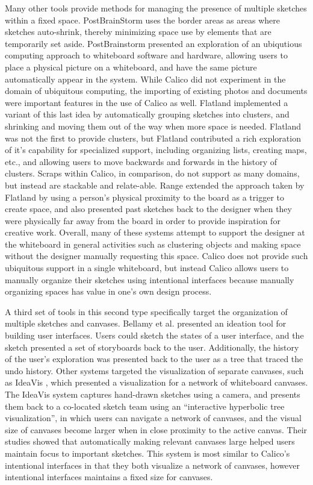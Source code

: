 \documentclass[12pt,fleqn]{ucithesis}
\begin{document}
Many other tools provide methods for managing the presence of multiple sketches within a fixed space. PostBrainStorm \citep{guimbretiere2001fluid} uses the border areas as areas where sketches auto-shrink, thereby minimizing space use by elements that are temporarily set aside. PostBrainstorm presented an exploration of an ubiqutious computing approach to whiteboard software and hardware, allowing users to place a physical picture on a whiteboard, and have the same picture automatically appear in the system. While Calico did not experiment in the domain of ubiquitous computing, the importing of existing photos and documents were important features in the use of Calico as well. Flatland \citep{mynatt1999flatland} implemented a variant of this last idea by automatically grouping sketches into clusters, and shrinking and moving them out of the way when more space is needed. Flatland was not the first to provide clusters, but Flatland contributed a rich exploration of it's capability for specialized support, including organizing lists, creating maps, etc., and allowing users to move backwards and forwards in the history of clusters. Scraps within Calico, in comparison, do not support as many domains, but instead are stackable and relate-able. Range \citep{Ju} extended the approach taken by Flatland by using a person's physical proximity to the board as a trigger to create space, and also presented past sketches back to the designer when they were physically far away from the board in order to provide inspiration for creative work. Overall, many of these systems attempt to support the designer at the whiteboard in general activities such as clustering objects and making space without the designer manually requesting this space. Calico does not provide such ubiquitous support in a single whiteboard, but instead Calico allows users to manually organize their sketches using intentional interfaces because manually organizing spaces has value in one's own design process.

A third set of tools in this second type specifically target the organization of multiple sketches and canvases. Bellamy et al. \cite{Bellamy:2011:STI:1985793.1985909} presented an ideation tool for building user interfaces. Users could sketch the states of a user interface, and the sketch presented a set of storyboards back to the user. Additionally, the history of the user's exploration was presented back to the user as a tree that traced the undo history. Other systems targeted the visualization of separate canvases, such as IdeaVis \cite{geyer2012ideavis}, which presented a visualization for a network of whiteboard canvases. The IdeaVis system captures hand-drawn sketches using a camera, and presents them back to a co-located sketch team using an ``interactive hyperbolic tree visualization'', in which users can navigate a network of canvases, and the visual size of canvases become larger when in close proximity to the active canvas. Their studies showed that automatically making relevant canvases large helped users maintain focus to important sketches. This system is most similar to Calico's intentional interfaces in that they both visualize a network of canvases, however intentional interfaces maintains a fixed size for canvases.
\end{document}
